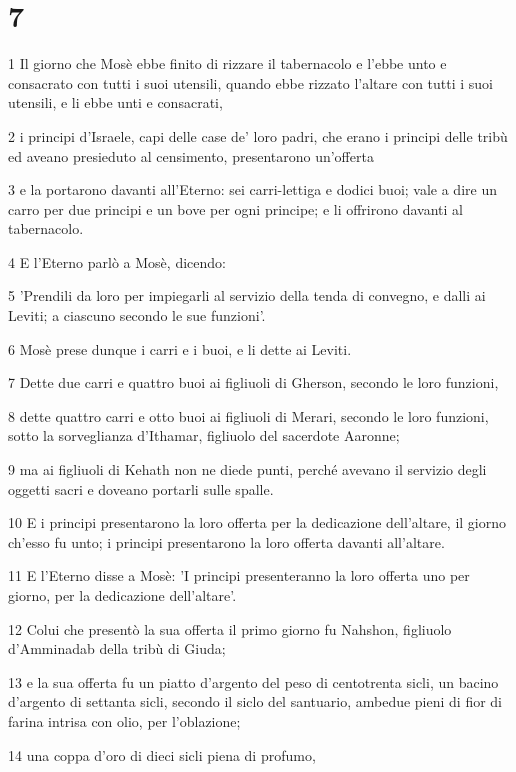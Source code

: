\chapter{7}

\par 1 Il giorno che Mosè ebbe finito di rizzare il tabernacolo e l'ebbe unto e consacrato con tutti i suoi utensili, quando ebbe rizzato l'altare con tutti i suoi utensili, e li ebbe unti e consacrati,
\par 2 i principi d'Israele, capi delle case de' loro padri, che erano i principi delle tribù ed aveano presieduto al censimento, presentarono un'offerta
\par 3 e la portarono davanti all'Eterno: sei carri-lettiga e dodici buoi; vale a dire un carro per due principi e un bove per ogni principe; e li offrirono davanti al tabernacolo.
\par 4 E l'Eterno parlò a Mosè, dicendo:
\par 5 'Prendili da loro per impiegarli al servizio della tenda di convegno, e dalli ai Leviti; a ciascuno secondo le sue funzioni'.
\par 6 Mosè prese dunque i carri e i buoi, e li dette ai Leviti.
\par 7 Dette due carri e quattro buoi ai figliuoli di Gherson, secondo le loro funzioni,
\par 8 dette quattro carri e otto buoi ai figliuoli di Merari, secondo le loro funzioni, sotto la sorveglianza d'Ithamar, figliuolo del sacerdote Aaronne;
\par 9 ma ai figliuoli di Kehath non ne diede punti, perché avevano il servizio degli oggetti sacri e doveano portarli sulle spalle.
\par 10 E i principi presentarono la loro offerta per la dedicazione dell'altare, il giorno ch'esso fu unto; i principi presentarono la loro offerta davanti all'altare.
\par 11 E l'Eterno disse a Mosè: 'I principi presenteranno la loro offerta uno per giorno, per la dedicazione dell'altare'.
\par 12 Colui che presentò la sua offerta il primo giorno fu Nahshon, figliuolo d'Amminadab della tribù di Giuda;
\par 13 e la sua offerta fu un piatto d'argento del peso di centotrenta sicli, un bacino d'argento di settanta sicli, secondo il siclo del santuario, ambedue pieni di fior di farina intrisa con olio, per l'oblazione;
\par 14 una coppa d'oro di dieci sicli piena di profumo,
